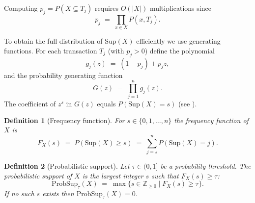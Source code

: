 \documentclass[10pt,letterpaper]{article}
\newtheorem{definition}{Definition}[section]
\newcounter{definition}
\begin{document}
Computing $p_j=P(X\subseteq T_j)$ requires $O(|X|)$ multiplications since
\begin{equation}
p_j \;=\; \prod_{x\in X} P(x,T_j).
\label{eq:pj}
\end{equation}

To obtain the full distribution of $\mathrm{Sup}(X)$ efficiently we use generating functions. For each transaction $T_j$ (with $p_j>0$) define the polynomial
\begin{equation}
g_j(z) \;=\; (1-p_j) + p_j z,
\label{eq:gj}
\end{equation}
and the probability generating function
\begin{equation}
G(z) \;=\; \prod_{j=1}^n g_j(z).
\label{eq:Gz}
\end{equation}
The coefficient of $z^s$ in $G(z)$ equals $P(\mathrm{Sup}(X)=s)$ (see \cite{bib3}).

\begin{definition}[Frequency function]
\label{def:freqfn}
For $s\in\{0,1,\dots,n\}$ the frequency function of $X$ is
\begin{equation}
F_X(s) \;=\; P(\mathrm{Sup}(X)\ge s) \;=\; \sum_{j=s}^n P(\mathrm{Sup}(X)=j).
\label{eq:FreqFn}
\end{equation}
\end{definition}

\begin{definition}[Probabilistic support]
\label{def:probsup}
Let $\tau\in(0,1]$ be a probability threshold. The probabilistic support of $X$ is the largest integer $s$ such that $F_X(s)\ge\tau$:
\begin{equation}
\mathrm{ProbSup}_{\tau}(X) \;=\; \max\{s\in\mathbb{Z}_{\ge0} \mid F_X(s)\ge\tau\}.
\label{eq:ProbSup}
\end{equation}
If no such $s$ exists then $\mathrm{ProbSup}_{\tau}(X)=0$.
\end{definition}
\end{document}
